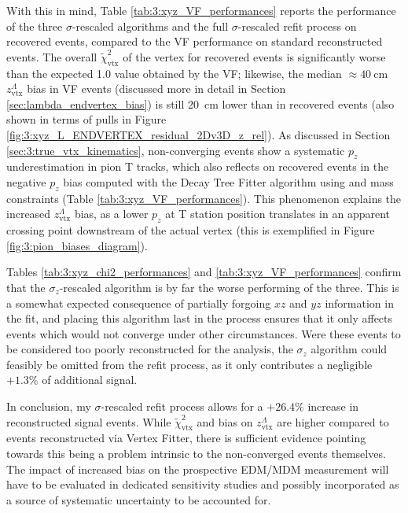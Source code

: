 With this in mind, Table \ref{tab:3:xyz_VF_performances} reports the performance of the three $\sigma$-rescaled algorithms and the full $\sigma$-rescaled refit process on recovered events, compared to the VF performance on standard reconstructed events.
The overall $\tilde{\chi}^2_\text{vtx}$ of the \lambdadecay vertex for recovered events is significantly worse than the expected 1.0 value obtained by the VF;
likewise, the median $\approx \SI{40}{\centi\meter}$ $z_\text{vtx}^\Lambda$ bias in VF events (discussed more in detail in Section \ref{sec:lambda_endvertex_bias}) is still \SI{20}{\centi\meter} lower than in recovered events (also shown in terms of pulls in Figure \ref{fig:3:xyz_L_ENDVERTEX_residual_2Dv3D_z_rel}).
As discussed in Section \ref{sec:3:true_vtx_kinematics}, non-converging events show a systematic $p_z$ underestimation in pion T tracks, which also reflects on recovered events in the negative $p_z$ bias computed with the Decay Tree Fitter algorithm using \jpsi and \lz mass constraints (Table \ref{tab:3:xyz_VF_performances}).
This phenomenon explains the increased $z_\text{vtx}^\Lambda$ bias, as a lower $p_z$ at T station position translates in an apparent crossing point downstream of the actual vertex (this is exemplified in Figure \ref{fig:3:pion_biases_diagram}).


Tables \ref{tab:3:xyz_chi2_performances} and \ref{tab:3:xyz_VF_performances} confirm that the $\sigma_z$-rescaled algorithm is by far the worse performing of the three.
This is a somewhat expected consequence of partially forgoing $xz$ and $yz$ information in the fit, and placing this algorithm last in the process ensures that it only affects events which would not converge under other circumstances.
Were these events to be considered too poorly reconstructed for the \lz analysis, the $\sigma_z$ algorithm could feasibly be omitted from the refit process, as it only contributes a negligible $+1.3\%$ of additional signal.

In conclusion, my $\sigma$-rescaled refit process allows for a $+26.4\%$ increase in reconstructed signal events.
While $\tilde{\chi}^2_\text{vtx}$ and bias on $z_\text{vtx}^\Lambda$ are higher compared to events reconstructed via Vertex Fitter, there is sufficient evidence pointing towards this being a problem intrinsic to the non-converged events themselves.
The impact of increased bias on the prospective \lz EDM/MDM measurement will have to be evaluated in dedicated sensitivity studies and possibly incorporated as a source of systematic uncertainty to be accounted for.

